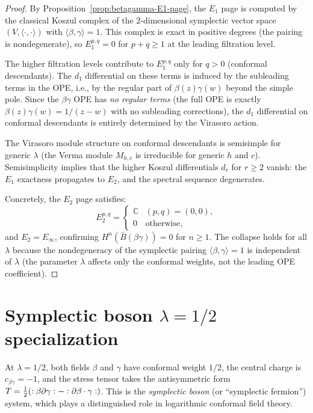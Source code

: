 \begin{proof}
By Proposition~\ref{prop:betagamma-E1-page}, the $E_1$ page is
computed by the classical Koszul complex of the $2$-dimensional
symplectic vector space $(V, \langle\cdot,\cdot\rangle)$ with
$\langle\beta,\gamma\rangle = 1$.  This complex is exact in
positive degrees (the pairing is nondegenerate), so
$E_1^{p,q} = 0$ for $p + q \geq 1$ at the leading filtration
level.

The higher filtration levels contribute to $E_1^{p,q}$ only
for $q > 0$ (conformal descendants).  The $d_1$ differential
on these terms is induced by the subleading terms in the OPE,
i.e., by the regular part of $\beta(z)\gamma(w)$ beyond the
simple pole.  Since the $\beta\gamma$ OPE has
\emph{no regular terms} (the full OPE is exactly
$\beta(z)\gamma(w) = 1/(z-w)$ with no subleading corrections),
the $d_1$ differential on conformal descendants is entirely
determined by the Virasoro action.

The Virasoro module structure on conformal descendants is
semisimple for generic $\lambda$ (the Verma module
$M_{h,c}$ is irreducible for generic $h$ and $c$).
Semisimplicity implies that the higher Koszul differentials
$d_r$ for $r \geq 2$ vanish: the $E_1$ exactness propagates
to $E_2$, and the spectral sequence degenerates.

Concretely, the $E_2$ page satisfies:
\[
E_2^{p,q} = \begin{cases}
\mathbb{C} & (p,q) = (0,0), \\
0 & \text{otherwise},
\end{cases}
\]
and $E_2 = E_\infty$, confirming
$H^n(\bar{B}(\beta\gamma)) = 0$ for $n \geq 1$.
The collapse holds for all $\lambda$ because the nondegeneracy
of the symplectic pairing $\langle \beta, \gamma \rangle = 1$
is independent of $\lambda$ (the parameter $\lambda$ affects
only the conformal weights, not the leading OPE coefficient).
\end{proof}


\section{Symplectic boson \texorpdfstring{$\lambda = 1/2$}{lambda = 1/2}
specialization}
\label{sec:symplectic-boson-bar}

At $\lambda = 1/2$, both fields $\beta$ and $\gamma$ have conformal
weight $1/2$, the central charge is $c_{\beta\gamma} = -1$, and the
stress tensor takes the antisymmetric form
$T = \frac{1}{2}(:{\beta\partial\gamma}:
- :{\partial\beta \cdot \gamma}:)$.
This is the \emph{symplectic boson} (or ``symplectic fermion'')
system, which plays a distinguished role in logarithmic conformal
field theory.

